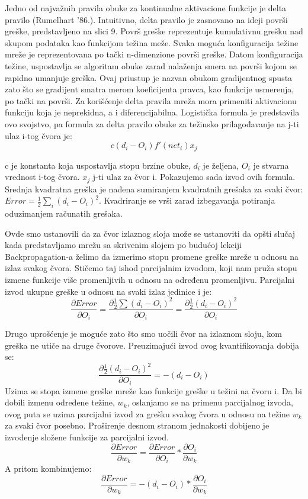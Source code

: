 \documentclass[fontsize=11bp, paper=a4]{scrarticle}
\begin{document}
Jedno od najvažnih pravila obuke za kontinualne aktivacione funkcije je delta pravilo (Rumelhart '86.). Intuitivno, delta pravilo je zasnovano na ideji površi greške, predstavljeno na slici 9. Površ greške reprezentuje kumulativnu grešku nad skupom podataka kao funkcijom težina meže. Svaka moguća konfiguracija težine mreže je reprezentovana po tački n-dimenzione površi greške. Datom konfiguracija težine, uspostavlja se algoritam obuke zarad nalaženja smera na površi kojom se rapidno umanjuje greška. Ovaj priustup je nazvan obukom gradijentnog spusta zato što se gradijent smatra merom koeficijenta pravca, kao funkcije usmerenja, po tački na površi. Za korišćenje delta pravila mreža mora primeniti aktivacionu funkciju koja je neprekidna, a i diferencijabilna. Logistička formula je predstavila ovo svojstvo, pa formula za delta pravilo obuke za težinsko prilagođavanje na j-ti ulaz i-tog čvora je:
$$
c(d_i - O_i)f'(net_i)x_j
$$

c je konstanta koja uspostavlja stopu brzine obuke, $d_i$ je željena, $O_i$ je stvarna vrednost i-tog čvora. $x_j$ j-ti ulaz za čvor i. Pokazujemo sada izvod ovih formula.
Srednja kvadratna greška je nađena sumiranjem kvadratnih grešaka za svaki čvor:
$Error = \frac{1}{2}\sum_{i} (d_i - O_i)^2$.
Kvadriranje se vrši zarad izbegavanja potiranja oduzimanjem računatih grešaka.

Ovde smo ustanovili da za čvor izlaznog sloja može se ustanoviti da opšti slučaj kada predstavljamo mrežu sa skrivenim slojem po budućoj lekciji Backpropagation-a želimo da izmerimo stopu promene greške mreže u odnosu na izlaz svakog čvora. Stičemo taj ishod parcijalnim izvodom, koji nam pruža stopu izmene funkcije više promenljivih u odnosu na određenu promenljivu. Parcijalni izvod ukupne greške u odnosu na svaki izlaz jedinice i je:
$$
\frac{\partial Error}{\partial O_i} = \frac{\partial \frac{1}{2}\sum (d_i - O_i)^2}{\partial O_i} = \frac{\partial \frac{1}{2}(d_i - O_i)^2}{\partial O_i}
$$

Drugo uprošćenje je moguće zato što smo uočili čvor na izlaznom sloju, kom greška ne utiče na druge čvorove. Preuzimajući izvod ovog kvantifikovanja dobija se:
$$
\frac{\partial \frac{1}{2}(d_i - O_i)^2}{\partial O_i} = - (d_i - O_i)
$$
Uzima se stopa izmene greške mreže kao funkcije greške u težini na čvoru i. Da bi dobili izmenu određene težine, $w_k$, oslanjamo se na primenu parcijalnog izvoda, ovog puta se uzima parcijalni izvod za grešku svakog čvora u odnosu na težine $w_k$ za svaki čvor posebno. Proširenje desnom stranom jednakosti dobijeno je izvođenje složene funkcije za parcijalni izvod.
$$
\frac{\partial Error}{\partial w_k}  = \frac{\partial Error}{\partial O_i} * \frac{\partial O_i}{\partial w_k} 
$$
A pritom kombinujemo:
$$
\frac{\partial Error}{\partial w_k}  = -(d_i - O_i) * \frac{\partial O_i}{\partial w_k} 
$$
\end{document}
